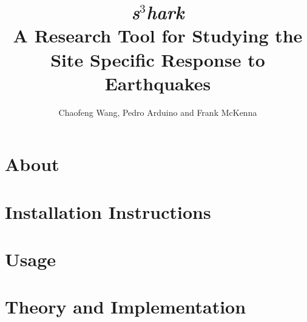 \documentclass{simcenterdocumentation}
\begin{document}
\title{\textit{s$^3$hark}\\ A Research Tool for Studying the Site Specific Response to Earthquakes}
\author{Chaofeng Wang, Pedro Arduino and Frank McKenna}

\hypersetup{pageanchor=false}
\maketitle
\copyrightpage
\acknowledgments

\hypersetup{pageanchor=true}
\begin{frontmatter}

\pagestyle{plain}
{
  \renewcommand{\thispagestyle}[1]{}
  \tableofcontents
  \clearpage
  \listoffigures
  \clearpage
  \listoftables
}

\end{frontmatter}
\pagestyle{somewhatsimple}

\chapter{About}
\label{chap:about}


\chapter{Installation Instructions}
\label{chap:installation}


\chapter{Usage}
\label{chap:usage}


\chapter{Theory and Implementation}
\label{chap:theory}

\end{document}

